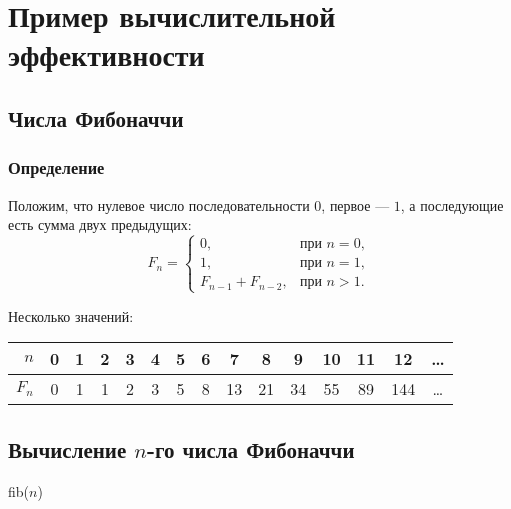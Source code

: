 \section{Пример вычислительной эффективности}


\subsection{Числа Фибоначчи}

\begin{frame}
    \frametitle{Определение}
    
    Положим, что нулевое число последовательности $0$, первое --- $1$, а последующие есть сумма двух предыдущих:
    \begin{equation}\label{eq:fib:main}
        F_n = 
        \begin{cases}
            0, & \textit{при $n=0$},\\
            1, & \textit{при $n=1$},\\
            F_{n-1} + F_{n-2}, & \textit{при $n>1$}.
        \end{cases}
    \end{equation}
    
    Несколько значений:
    \begin{center}
        \begin{tabular}{r|c|c|c|c|c|c|c|c|c|c|c|c|c|c}
            \hline
            $n$      & 0 & 1 & 2 & 3 & 4 & 5 & 6 & 7  & 8  & 9  & 10 & 11 & 12 & \ldots\\
            \hline
            $F_n$ & 0 & 1 & 1 & 2 & 3 & 5 & 8 & 13 & 21 & 34 & 55 & 89 & 144   & \ldots\\
            \hline
        \end{tabular}
    \end{center}
\end{frame}


\subsection{Вычисление $n$-го числа Фибоначчи}

\begin{frame}
    \begin{center}
    \end{center}
\end{frame}

\begin{frame}
    \begin{algorithm}[H]
        \caption{fib($n$)}
        \begin{algorithmic}[1]
            
            \ENDIF
            \ENDIF
        \end{algorithmic}
    \end{algorithm}
\end{frame}

